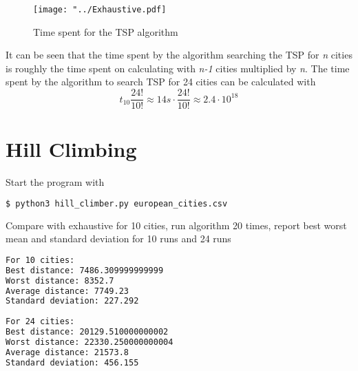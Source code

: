 \documentclass{article}
\begin{document}
\begin{figure}[H]
\begin{center}
\texttt{[image: "../Exhaustive.pdf]}
\caption{Time spent for the TSP algorithm}
\end{center}
\end{figure}

It can be seen that the time spent by the algorithm searching the TSP for \textit{n} cities is roughly the time spent on calculating with \textit{n-1} cities multiplied by \textit{n}. The time spent by the algorithm to search TSP for 24 cities can be calculated with
\[
	t_{10} \frac{24!}{10!} \approx 14s \cdot \frac{24!}{10!} \approx 2.4 \cdot 10^{18}
\]


\section{Hill Climbing}

Start the program with
\begin{lstlisting}[language=bash]
	$ python3 hill_climber.py european_cities.csv 
\end{lstlisting}
Compare with exhaustive for 10 cities, run algorithm 20 times, report best worst mean and standard deviation for 10 runs and 24 runs
\begin{lstlisting}[language=bash]
For 10 cities:
Best distance: 7486.309999999999
Worst distance: 8352.7
Average distance: 7749.23
Standard deviation: 227.292
 
For 24 cities:
Best distance: 20129.510000000002
Worst distance: 22330.250000000004
Average distance: 21573.8
Standard deviation: 456.155
\end{lstlisting}
\end{document}
